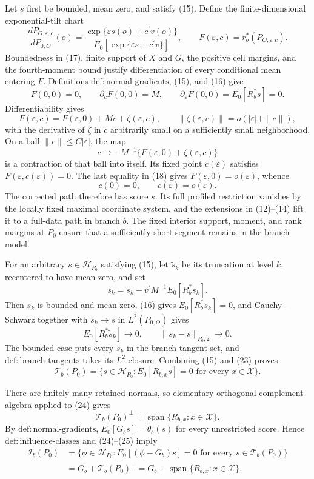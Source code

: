 Let \(s\) first be bounded, mean zero, and satisfy (15). Define the finite-dimensional exponential-tilt chart
\[
 \frac{dP_{O,\varepsilon,c}}{dP_{0,O}}(o)
 =\frac{\exp\{\varepsilon s(o)+c^{\prime}v(o)\}}
 {E_0[\exp\{\varepsilon s+c^{\prime}v\}]},
 \qquad
 F(\varepsilon,c)=r_b^{\ast}(P_{O,\varepsilon,c}).
 \tag{17}
\]
Boundedness in (17), finite support of \(X\) and \(G\), the positive cell margins, and the fourth-moment bound justify differentiation of every conditional mean entering \(F\). Definitions \(\mathrm{def{:}normal\text{-}gradients}\), (15), and (16) give
\[
 F(0,0)=0,
 \qquad
 \partial_cF(0,0)=M,
 \qquad
 \partial_\varepsilon F(0,0)=E_0[R_b^{\ast}s]=0.
 \tag{18}
\]
Differentiability gives
\[
 F(\varepsilon,c)=F(\varepsilon,0)+Mc+\zeta(\varepsilon,c),
 \qquad
 \|\zeta(\varepsilon,c)\|=o(|\varepsilon|+\|c\|),
 \tag{19}
\]
with the derivative of \(\zeta\) in \(c\) arbitrarily small on a sufficiently small neighborhood. On a ball \(\|c\|\le C|\varepsilon|\), the map
\[
 c\longmapsto-M^{-1}\{F(\varepsilon,0)+\zeta(\varepsilon,c)\}
 \tag{20}
\]
is a contraction of that ball into itself. Its fixed point \(c(\varepsilon)\) satisfies \(F(\varepsilon,c(\varepsilon))=0\). The last equality in (18) gives \(F(\varepsilon,0)=o(\varepsilon)\), whence
\[
 c(0)=0,
 \qquad
 c(\varepsilon)=o(\varepsilon).
 \tag{21}
\]
The corrected path therefore has score \(s\). Its full profiled restriction vanishes by the locally fixed maximal coordinate system, and the extensions in (12)--(14) lift it to a full-data path in branch \(b\). The fixed interior support, moment, and rank margins at \(P_0\) ensure that a sufficiently short segment remains in the branch model.

For an arbitrary \(s\in\mathcal H_{P_0}\) satisfying (15), let \(\widetilde s_k\) be its truncation at level \(k\), recentered to have mean zero, and set
\[
 s_k=\widetilde s_k-v^{\prime}M^{-1}E_0[R_b^{\ast}\widetilde s_k].
 \tag{22}
\]
Then \(s_k\) is bounded and mean zero, (16) gives \(E_0[R_b^{\ast}s_k]=0\), and Cauchy--Schwarz together with \(\widetilde s_k\to s\) in \(L^2(P_{0,O})\) gives
\[
 E_0[R_b^{\ast}\widetilde s_k]\longrightarrow0,
 \qquad
 \|s_k-s\|_{P_0,2}\longrightarrow0.
 \tag{23}
\]
The bounded case puts every \(s_k\) in the branch tangent set, and \(\mathrm{def{:}branch\text{-}tangents}\) takes its \(L^2\)-closure. Combining (15) and (23) proves
\[
 \mathcal T_b(P_0)
 =\{s\in\mathcal H_{P_0}:E_0[R_{b,x}s]=0
       \text{ for every }x\in\mathcal X\}.
 \tag{24}
\]

There are finitely many retained normals, so elementary orthogonal-complement algebra applied to (24) gives
\[
 \mathcal T_b(P_0)^{\perp}
 =\operatorname{span}\{R_{b,x}:x\in\mathcal X\}.
 \tag{25}
\]
By \(\mathrm{def{:}normal\text{-}gradients}\), \(E_0[G_bs]=\dot\theta_b(s)\) for every unrestricted score. Hence \(\mathrm{def{:}influence\text{-}classes}\) and (24)--(25) imply
\[
 \begin{aligned}
 \mathcal I_b(P_0)
 &=\{\phi\in\mathcal H_{P_0}:E_0[(\phi-G_b)s]=0
       \text{ for every }s\in\mathcal T_b(P_0)\}\\
 &=G_b+\mathcal T_b(P_0)^{\perp}
 =G_b+\operatorname{span}\{R_{b,x}:x\in\mathcal X\}.
 \end{aligned}
 \tag{26}
\]

